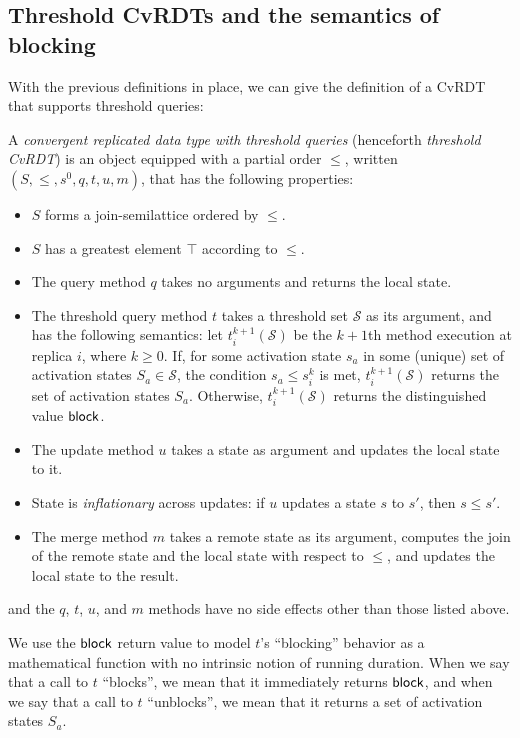 \subsection{Threshold CvRDTs and the semantics of blocking}\label{subsection:distributed-blocking}

With the previous definitions in place, we can give the definition of
a CvRDT that supports threshold queries:

\begin{definition}
  \label{def:cvrdt-with-threshold-queries}
  A \emph{convergent replicated data type with threshold queries}
  (henceforth \emph{threshold CvRDT}) is an object equipped
  with a partial order $\leq$, written $(S, \leq, s^0, q, t, u, m)$,
  that has the following properties:
  \begin{itemize}
    \item $S$ forms a join-semilattice ordered by $\leq$.
    \item $S$ has a greatest element $\top$ according to $\leq$.
    \item The query method $q$ takes no arguments and returns the
      local state.
    \item The threshold query method $t$ takes a threshold set
      $\mathcal{S}$ as its argument, and has the following semantics:
      let $t^{k+1}_i(\mathcal{S})$ be the $k+1$th method execution at
      replica $i$, where $k \geq 0$.  If, for some activation state
      $s_a$ in some (unique) set of activation states $S_a \in
      \mathcal{S}$, the condition $s_a \leq s^{k}_{i}$ is met,
      $t^{k+1}_i(\mathcal{S})$ returns the set of activation states
      $S_a$.  Otherwise, $t^{k+1}_i(\mathcal{S})$ returns the
      distinguished value $\textsf{block}$.
    \item The update method $u$ takes a state as argument and updates
      the local state to it.
    \item State is \emph{inflationary} across updates: if $u$ updates
      a state $s$ to $s'$, then $s \leq s'$.
    \item The merge method $m$ takes a remote state as its argument,
      computes the join of the remote state and the local state with
      respect to $\leq$, and updates the local state to the result.
  \end{itemize}
  and the $q$, $t$, $u$, and $m$ methods have no side effects other
  than those listed above.
\end{definition}
We use the $\textsf{block}$ return value to model $t$'s ``blocking'' behavior
as a mathematical function with no intrinsic notion of running
duration.  When we say that a call to $t$ ``blocks'', we mean that it
immediately returns $\textsf{block}$, and when we say that a call to $t$
``unblocks'', we mean that it returns a set of activation states
$S_a$.

